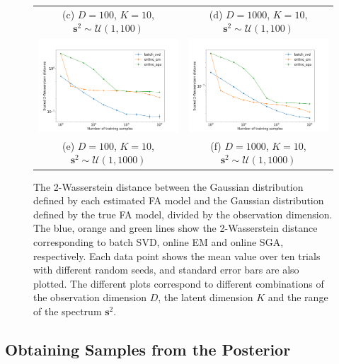 \documentclass[msc,deptreport.inf]{infthesis} %
\newcommand{\matr}[1]{\mathbf{#1}}
\begin{document}
\begin{figure}[!htbp]
\begin{tabular}{cc}
		 (c) $D=100$, $K=10$, $\matr{s}^2 \sim \mathcal{U}(1, 100)$ 
		 & (d) $D=1000$, $K=10$, $\matr{s}^2 \sim \mathcal{U}(1, 100)$\\[6pt]
		 \includegraphics[width=70mm]{plots/online_fa_wasserstein__observation_dim=100__latent_dim=10__spectrum_min=1__spectrum_max=1000.png} 
		 & \includegraphics[width=70mm]{plots/online_fa_wasserstein__observation_dim=1000__latent_dim=10__spectrum_min=1__spectrum_max=1000.png} \\
		 (e) $D=100$, $K=10$, $\matr{s}^2 \sim \mathcal{U}(1, 1000)$ 
		 & (f) $D=1000$, $K=10$, $\matr{s}^2 \sim \mathcal{U}(1, 1000)$\\[6pt]
	\end{tabular}
	\caption{The 2-Wasserstein distance between the Gaussian distribution defined by each estimated FA model and the Gaussian distribution defined by the true FA model, divided by the observation dimension. The blue, orange and green lines show the 2-Wasserstein distance corresponding to batch SVD, online EM and online SGA, respectively. Each data point shows the mean value over ten trials with different random seeds, and standard error bars are also plotted. The different plots correspond to different combinations of the observation dimension $D$, the latent dimension $K$ and the range of the spectrum $\matr{s}^2$.}
	\label{fig:fa_wasserstein}
\end{figure}

\subsection{Obtaining Samples from the Posterior}\label{sec:linear_regression_posterior_experiments}
\end{document}
